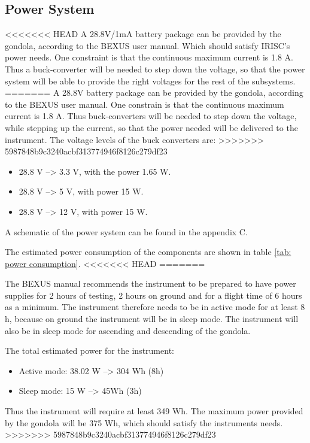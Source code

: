 \pagebreak
\subsection{Power System}
<<<<<<< HEAD
A 28.8V/1mA battery package can be provided by the gondola, according to the BEXUS user manual. Which should satisfy IRISC's power needs. One constraint is that the continuous maximum current is 1.8 A. Thus a buck-converter will be needed to step down the voltage, so that the power system will be able to provide the right voltages for the rest of the subsystems.  
=======
A 28.8V battery package can be provided by the gondola, according to the BEXUS user manual. One constrain is that the continuous maximum current is 1.8 A. Thus buck-converters will be needed to step down the voltage, while stepping up the current, so that the power needed will be delivered to the instrument. The voltage levels of the buck converters are: 
>>>>>>> 5987848b9c3240acbf313774946f8126c279df23

\begin{itemize}
	\item 28.8 V --> 3.3 V, with the power 1.65 W.
	\item 28.8 V --> 5 V, with power 15 W.
	\item 28.8 V --> 12 V, with power 15 W.
\end{itemize}

A schematic of the power system can be found in the appendix C.

The estimated power consumption of the components are shown in table \ref{tab: power consumption}. 
<<<<<<< HEAD
=======


\newpage

The BEXUS manual recommends the instrument to be prepared to have power supplies for 2 hours of testing, 2 hours on ground and for a flight time of 6 hours as a minimum. The instrument therefore needs to be in active mode for at least 8 h, because on ground the instrument will be in sleep mode. The instrument will also be in sleep mode for ascending and descending of the gondola. 

The total estimated power for the instrument:

\begin{itemize}
    \item Active mode: 38.02 W  --> 304 Wh (8h)
    \item Sleep mode: 15 W --> 45Wh (3h) 
\end{itemize}

Thus the instrument will require at least 349 Wh. The maximum power provided by the gondola will be 375 Wh, which should satisfy the instruments needs.
>>>>>>> 5987848b9c3240acbf313774946f8126c279df23




\raggedbottom
